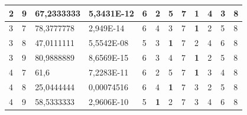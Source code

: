 \documentclass[conference]{IEEEtran}
\begin{document}
\begin{table}[]
\begin{tabular}{|llll|llllllll|}
		\multicolumn{1}{|l|}{2}   & \multicolumn{1}{l|}{9}         & \multicolumn{1}{l|}{67,2333333}    & 5,3431E-12 & \multicolumn{1}{l|}{6}   & \multicolumn{1}{l|}{2}          & \multicolumn{1}{l|}{5}          & \multicolumn{1}{l|}{7}          & \multicolumn{1}{l|}{\textbf{1}} & \multicolumn{1}{l|}{4}          & \multicolumn{1}{l|}{3}   & 8                      \\ \hline
		\multicolumn{1}{|l|}{3}   & \multicolumn{1}{l|}{7}         & \multicolumn{1}{l|}{78,3777778}    & 2,949E-14  & \multicolumn{1}{l|}{6}   & \multicolumn{1}{l|}{4}          & \multicolumn{1}{l|}{3}          & \multicolumn{1}{l|}{7}          & \multicolumn{1}{l|}{\textbf{1}} & \multicolumn{1}{l|}{2}          & \multicolumn{1}{l|}{5}   & 8                      \\ \hline
		\multicolumn{1}{|l|}{3}   & \multicolumn{1}{l|}{8}         & \multicolumn{1}{l|}{47,0111111}    & 5,5542E-08 & \multicolumn{1}{l|}{5}   & \multicolumn{1}{l|}{3}          & \multicolumn{1}{l|}{\textbf{1}} & \multicolumn{1}{l|}{7}          & \multicolumn{1}{l|}{2}          & \multicolumn{1}{l|}{4}          & \multicolumn{1}{l|}{6}   & 8                      \\ \hline
		\multicolumn{1}{|l|}{3}   & \multicolumn{1}{l|}{9}         & \multicolumn{1}{l|}{80,9888889}    & 8,6569E-15 & \multicolumn{1}{l|}{6}   & \multicolumn{1}{l|}{3}          & \multicolumn{1}{l|}{4}          & \multicolumn{1}{l|}{7}          & \multicolumn{1}{l|}{\textbf{1}} & \multicolumn{1}{l|}{2}          & \multicolumn{1}{l|}{5}   & 8                      \\ \hline
		\multicolumn{1}{|l|}{4}   & \multicolumn{1}{l|}{7}         & \multicolumn{1}{l|}{61,6}          & 7,2283E-11 & \multicolumn{1}{l|}{6}   & \multicolumn{1}{l|}{2}          & \multicolumn{1}{l|}{5}          & \multicolumn{1}{l|}{7}          & \multicolumn{1}{l|}{\textbf{1}} & \multicolumn{1}{l|}{3}          & \multicolumn{1}{l|}{4}   & 8                      \\ \hline
		\multicolumn{1}{|l|}{4}   & \multicolumn{1}{l|}{8}         & \multicolumn{1}{l|}{25,0444444}    & 0,00074516 & \multicolumn{1}{l|}{6}   & \multicolumn{1}{l|}{4}          & \multicolumn{1}{l|}{\textbf{1}} & \multicolumn{1}{l|}{7}          & \multicolumn{1}{l|}{3}          & \multicolumn{1}{l|}{2}          & \multicolumn{1}{l|}{5}   & 8                      \\ \hline
		\multicolumn{1}{|l|}{4}   & \multicolumn{1}{l|}{9}         & \multicolumn{1}{l|}{58,5333333}    & 2,9606E-10 & \multicolumn{1}{l|}{5}   & \multicolumn{1}{l|}{\textbf{1}} & \multicolumn{1}{l|}{2}          & \multicolumn{1}{l|}{7}          & \multicolumn{1}{l|}{3}          & \multicolumn{1}{l|}{4}          & \multicolumn{1}{l|}{6}   & 8                      \\ \hline

\end{tabular}
\end{table}
\end{document}
